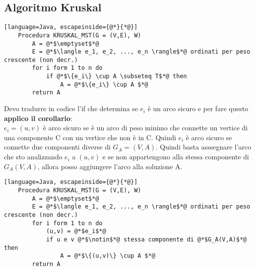 \subsection{Algoritmo Kruskal}
\begin{lstlisting}[language=Java, escapeinside={@*}{*@}]
    Procedura KRUSKAL_MST(G = (V,E), W)
        A = @*$\emptyset$*@
        E = @*$\langle e_1, e_2, ..., e_n \rangle$*@ ordinati per peso crescente (non decr.)
        for i form 1 to n do
            if @*$\{e_i\} \cup A \subseteq T$*@ then
                A = @*$\{e_i\} \cup A $*@
        return A
\end{lstlisting}
Devo tradurre in codice l'if che determina se $e_i$ è un arco sicuro e per fare questo
\textbf{applico il corollario}:\\
$e_i = (u,v)$ è arco sicuro se è un arco di peso minimo che connette un vertice di una componente C
con un vertice che non è in C. Quindi $e_i$ è arco sicuro se connette due componenti diverse
di $G_A = (V,A)$. Quindi basta asssegnare l'arco che sto analizzando $e_i$ a $(u,v)$ e se
non appartengono alla stessa componente di $G_A(V,A)$, allora posso aggiungere l'arco alla soluzione A.
\begin{lstlisting}[language=Java, escapeinside={@*}{*@}]
    Procedura KRUSKAL_MST(G = (V,E), W)
        A = @*$\emptyset$*@
        E = @*$\langle e_1, e_2, ..., e_n \rangle$*@ ordinati per peso crescente (non decr.)
        for i form 1 to n do
            (u,v) = @*$e_i$*@
            if u e v @*$\notin$*@ stessa componente di @*$G_A(V,A)$*@ then
                A = @*$\{(u,v)\} \cup A $*@
        return A
\end{lstlisting}
